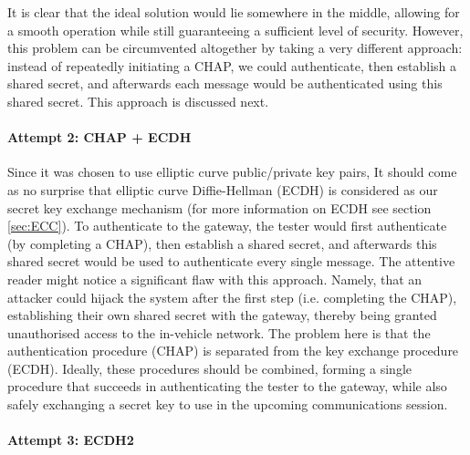 \documentclass[11pt]{article}
\begin{document}
It is clear that the ideal solution would lie somewhere in the middle, allowing for a smooth operation while still guaranteeing a sufficient level of security. However, this problem can be circumvented altogether by taking a very different approach: instead of repeatedly initiating a CHAP, we could authenticate, then establish a shared secret, and afterwards each message would be authenticated using this shared secret. This approach is discussed next.

\paragraph{Attempt 2: CHAP + ECDH}
Since it was chosen to use elliptic curve public/private key pairs, It should come as no surprise that elliptic curve Diffie-Hellman (ECDH) is considered as our secret key exchange mechanism (for more information on ECDH see section \ref{sec:ECC}). To authenticate to the gateway, the tester would first authenticate (by completing a CHAP), then establish a shared secret, and afterwards this shared secret would be used to authenticate every single message. The attentive reader might notice a significant flaw with this approach. Namely, that an attacker could hijack the system after the first step (i.e. completing the CHAP), establishing their own shared secret with the gateway, thereby being granted unauthorised access to the in-vehicle network. The problem here is that the authentication procedure (CHAP) is separated from the key exchange procedure (ECDH). Ideally, these procedures should be combined, forming a single procedure that succeeds in authenticating the tester to the gateway, while also safely exchanging a secret key to use in the upcoming communications session.

\paragraph{Attempt 3: ECDH2} 
 
\end{document}
